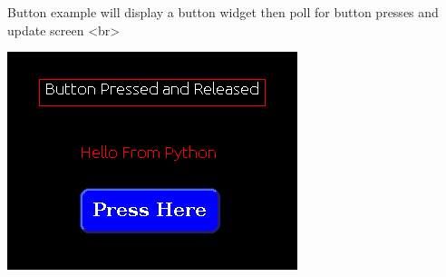 \begin{DoxyVerb}Button example will display a button widget then poll for button presses and update screen <br>
\end{DoxyVerb}
  
\begin{DoxyImageNoCaption}
  \mbox{\includegraphics{button.png}}
\end{DoxyImageNoCaption}
 
